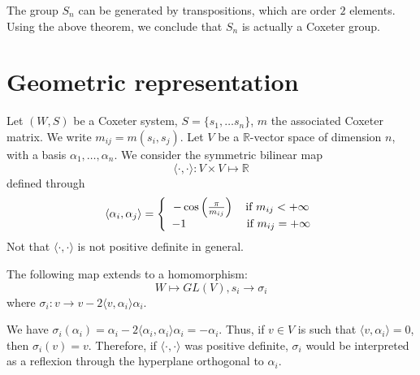 \documentclass[envcountsame,envcountchap]{svmono}
\begin{document}
\begin{example}
The group $S_n$ can be generated by transpositions, which are order $2$ elements. Using the above theorem, we conclude that $S_n$ is actually a Coxeter group. 
\end{example}

\section{Geometric representation}

Let $(W, S)$ be a Coxeter system, $S = \{s_1, \ldots s_n \}$, $m$ the associated Coxeter matrix. We write $m_{ij} = m(s_i, s_j)$. Let $V$ be a $\mathbb{R}$-vector space of dimension $n$, with a basis $\alpha_1, \ldots , \alpha_n$. We consider the symmetric bilinear map
\begin{equation}
\langle \cdot, \cdot \rangle : V \times V \mapsto \mathbb{R}
\end{equation} defined through
\begin{equation}
\langle \alpha_i , \alpha_j \rangle = \left \{
\begin{array}{c @{} c}
    &- \cos \left(\frac{\pi}{m_{ij}} \right) \quad \text{if } m_{ij} < + \infty \\
    &-1 \quad ~~~~~~~~~~~~~\text{if } m_{ij} = + \infty \\
\end{array}
\right.
\end{equation} Not that $\langle \cdot, \cdot \rangle$ is not positive definite in general. 

\begin{proposition}
The following map extends to a homomorphism:
\begin{equation}
W \mapsto GL(V), s_i \to \sigma_i
\end{equation} where $\sigma_i :v \to  v - 2 \langle v, \alpha_i \rangle \alpha_i$. 
\end{proposition}

\begin{remark}
We have $\sigma_i (\alpha_i) = \alpha_i - 2 \langle \alpha_i, \alpha_i \rangle \alpha_i = - \alpha_i$. Thus, if $v\in V$ is such that $\langle v, \alpha_i \rangle = 0$, then $\sigma_i (v) = v$. Therefore, if $\langle \cdot, \cdot \rangle$ was positive definite, $\sigma_i$ would be interpreted as a reflexion through the hyperplane orthogonal to $\alpha_i$. 
\end{remark}
\end{document}
